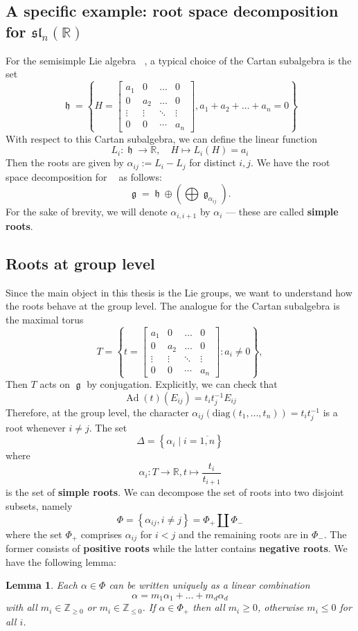 \documentclass[12pt]{article} %
\newtheorem{lemma}[definition]{Lemma}
\DeclareMathOperator{\fg}{\mathfrak{g}}
\DeclareMathOperator{\fh}{\mathfrak{h}}
\DeclareMathOperator{\slnr}{\mathfrak{sl}_n(\mathbb{R})}
\DeclareMathOperator{\Ad}{\text{Ad}}
\begin{document}
\subsection{A specific example: root space decomposition for $\mathfrak{sl}_n(\mathbb{R})$}
For the semisimple Lie algebra $\slnr$, a typical choice of the Cartan subalgebra is the set
\[\fh = \left\lbrace H= \begin{bmatrix}
        a_1    & 0      & \ldots & 0      \\
        0      & a_2    & \ldots & 0      \\
        \vdots & \vdots & \ddots & \vdots \\
        0      & 0      & \cdots & a_n
    \end{bmatrix}, a_1 + a_2+ \ldots + a_n = 0\right\rbrace\]
With respect to this Cartan subalgebra, we can define the linear function
\[L_i \colon \fh \to \mathbb{R}, \quad H \mapsto L_i(H)= a_i\]
Then the roots are given by $\alpha_{ij} :=L_i - L_j$ for distinct $i,j$. We have the root space decomposition for $\slnr$ as follows:
\[\fg = \fh \oplus \left(\bigoplus\fg_{\alpha_{ij}}\right).\]
For the sake of brevity, we will denote $\alpha_{i,i+1}$ by $\alpha_i$ — these are called \textbf{simple roots}.
\subsection{Roots at group level}
Since the main object in this thesis is the Lie groups, we want to understand how the roots
behave at the group level. The analogue for the Cartan subalgebra is the maximal torus
\[T = \left\lbrace t= \begin{bmatrix}
        a_1    & 0      & \ldots & 0      \\
        0      & a_2    & \ldots & 0      \\
        \vdots & \vdots & \ddots & \vdots \\
        0      & 0      & \cdots & a_n
    \end{bmatrix} :  a_i \ne 0\right\rbrace,\]
Then $T$ acts on $\fg$ by conjugation. Explicitly, we can check that
\[\Ad(t)(E_{ij}) = t_it_j^{-1}E_{ij}\]
Therefore, at the group level, the character $\alpha_{ij}(\text{diag}(t_1,\ldots,t_n))=t_it_j^{-1}$
is a root whenever $i \ne j$. The set
\[\Delta = \left\lbrace \alpha_i\mid i =\overline{1,n}\right\rbrace\]
where
\[\alpha_i \colon T \to \mathbb{R}, t \mapsto \dfrac{t_i}{t_{i+1}}\]
is the set of \textbf{simple roots}.
We can decompose the set of roots into two disjoint subsets, namely
\[\Phi = \left\lbrace \alpha_{ij}, i \ne j\right\rbrace = \Phi_+ \coprod \Phi_{-}\]
where the set $\Phi_+$ comprises $\alpha_{ij}$ for $i<j$ and the remaining roots are in $\Phi_{-}$. The former consists of
\textbf{positive roots} while the latter contains \textbf{negative roots}. We have the following lemma:
\begin{lemma}\label{linear-comb-of-roots}
    Each $\alpha \in \Phi$ can be written uniquely as a linear combination
    \[\alpha = m_1\alpha_1+\ldots+m_{d}\alpha_{d}\]
    with all $m_i \in \mathbb{Z}_{\ge 0}$ or $m_i \in \mathbb{Z}_{\le 0}$. If $\alpha \in \Phi_+$ then all $m_i \ge 0$, otherwise $m_i \le 0$ for all $i$.
\end{lemma}
\end{document}
